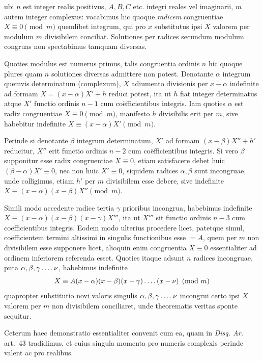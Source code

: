 %
ubi $n$ est integer realis positivus, $A,B,C$ etc. integri reales vel imaginarii, $m$ autem integer complexus: vocabimus hic quoque \emph{radicem} congruentiae $X\equiv0\pmod m$ quemlibet integrum, qui pro $x$ substitutus ipsi $X$ valorem per modulum $m$ divisibilem conciliat. Solutiones per radices secundum modulum congruas non spectabimus tamquam diversas.

Quoties modulus est numerus primus, talis congruentia ordinis $n$ hic quoque plures quam $n$ solutiones diversas admittere non potest. Denotante $\alpha$ integrum quemvis determinatum (complexum), $X$ adiumento divisionis per $x-\alpha$ indefinite ad formam $X=(x-\alpha)X'+h$ reduci potest, ita ut $h$ fiat integer determinatus atque $X'$ functio ordinis $n-1$ cum coëfficientibus integris. Iam quoties $\alpha$ est radix congruentiae $X\equiv0\pmod m$, manifesto $h$ divisibilis erit per $m$, sive habebitur indefinite $X\equiv(x-\alpha)X'\pmod m$.

Perinde si denotante $\beta$ integrum determinatum, $X'$ ad formam $(x-\beta)X''+h'$ reducitur, $X''$ erit functio ordinis $n-2$ cum coëfficientibus integris. Si vero $\beta$ supponitur esse radix congruentiae $X\equiv0$, etiam satisfacere debet huic $(\beta-\alpha)X'\equiv0$, nec non huic $X'\equiv0$, siquidem radices $\alpha,\beta$ sunt incongruae, unde colligimus, etiam $h'$ per $m$ divisibilem esse debere, sive indefinite $X\equiv(x-\alpha)(x-\beta)X''\pmod m$.

Simili modo accedente radice tertia $\gamma$ prioribus incongrua, habebimus indefinite $X\equiv(x-\alpha)(x-\beta)(x-\gamma)X'''$, ita ut $X'''$ sit functio ordinis $n-3$ cum coëfficientibus integris. Eodem modo ulterius procedere licet, patetque simul, coëfficientem termini altissimi in singulis functionibus esse $=A$, quem per $m$ non divisibilem esse supponere licet, alioquin enim congruentia $X\equiv0$ essentialiter ad ordinem inferiorem referenda esset. Quoties itaque adsunt $n$ radices incongruae, puta $\alpha,\beta,\gamma\mathinner{.\,.\,.\,.}\nu$, habebimus indefinite
\[
X\equiv A(x-\alpha)(x-\beta)(x-\gamma)\mathinner{.\,.\,.\,.}(x-\nu)\pmod m
\]
quapropter substitutio novi valoris singulis $\alpha,\beta,\gamma\mathinner{.\,.\,.\,.}\nu$ incongrui certo ipsi $X$ valorem per $m$ non divisibilem conciliaret, unde theorematis veritas sponte sequitur.

Ceterum haec demonstratio essentialiter convenit cum ea, quam in \emph{Disq. Ar.} art.~43 tradidimus, et cuius singula momenta pro numeris complexis perinde valent ac pro realibus.


